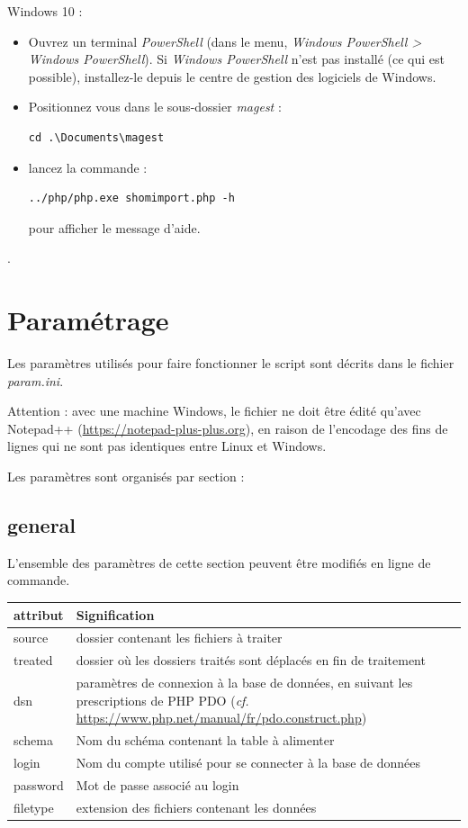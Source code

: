 \documentclass[12pt,a4paper]{article}
\begin{document}
Windows 10 :
\begin{itemize}
\item Ouvrez un terminal \textit{PowerShell} (dans le menu, \textit{Windows PowerShell > Windows PowerShell}). Si \textit{Windows PowerShell} n'est pas installé (ce qui est possible), installez-le depuis le centre de gestion des logiciels de Windows.
\item Positionnez vous dans le sous-dossier \textit{magest} :
\begin{lstlisting}
cd .\Documents\magest
\end{lstlisting}
\item lancez la commande :
\begin{lstlisting}
../php/php.exe shomimport.php -h
\end{lstlisting}
pour afficher le message d'aide.
\end{itemize}
. 

\section{Paramétrage}
Les paramètres utilisés pour faire fonctionner le script sont décrits dans le fichier \textit{param.ini}.

Attention : avec une machine Windows, le fichier ne doit être édité qu'avec Notepad++ (\url{https://notepad-plus-plus.org}), en raison de l'encodage des fins de lignes qui ne sont pas identiques entre Linux et Windows.

Les paramètres sont organisés par section :

\subsection{general}
L'ensemble des paramètres de cette section peuvent être modifiés en ligne de commande.

\begin{tabular}{|l|>{\raggedright\arraybackslash}p{12cm}|}
\hline 
attribut & Signification \\ 
\hline 
source & dossier contenant les fichiers à traiter  \\ 
treated & dossier où les dossiers traités sont déplacés en fin de traitement \\ 
dsn & paramètres de connexion à la base de données, en suivant les prescriptions de PHP PDO (\textit{cf.} \href{https://www.php.net/manual/fr/pdo.construct.php}{https://www.php.net/manual/fr/pdo.construct.php}) \\ 
schema &  Nom du schéma contenant la table à alimenter\\ 
login & Nom du compte utilisé pour se connecter à la base de données \\ 
password & Mot de passe associé au login \\ 
filetype & extension des fichiers contenant les données \\
\hline 
\end{tabular} 
\end{document}
